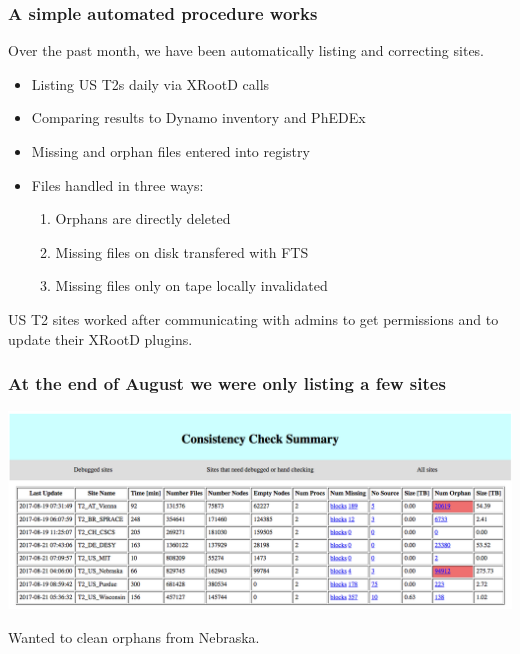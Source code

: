 \documentclass{beamer}
\begin{document}
\begin{frame}
  \frametitle{A simple automated procedure works}

  Over the past month,
  we have been automatically listing and correcting sites.

  \begin{itemize}
  \item Listing US T2s daily via XRootD calls
  \item Comparing results to Dynamo inventory and PhEDEx
  \item Missing and orphan files entered into registry
  \item Files handled in three ways:
    \begin{enumerate}
    \item Orphans are directly deleted
    \item Missing files on disk transfered with FTS
    \item Missing files only on tape locally invalidated
    \end{enumerate}
  \end{itemize}

  US T2 sites worked after communicating with admins
  to get permissions and to update their XRootD plugins.

\end{frame}

\begin{frame}
  \frametitle{At the end of August we were only listing a few sites}

  \includegraphics[width=\linewidth]{first_screenshot.png}

  Wanted to clean orphans from Nebraska.

\end{frame}
\end{document}
